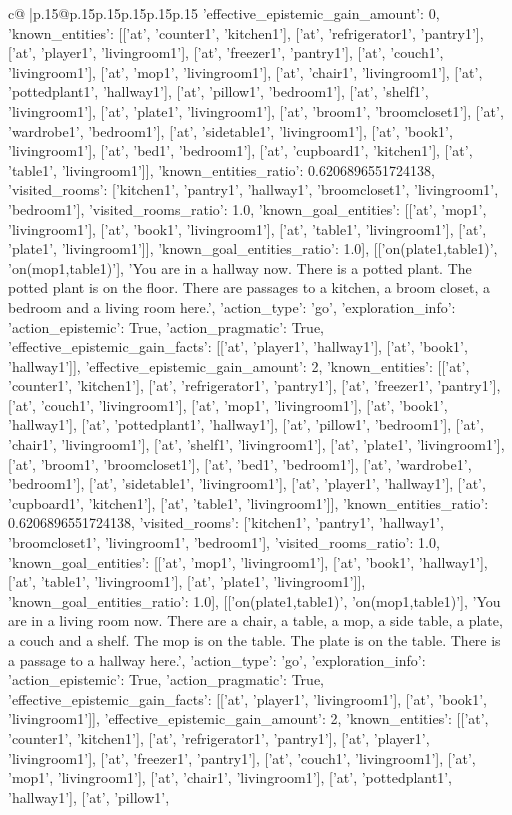 \documentclass{article}
\begin{document}
{\begin{supertabular}{c@{$\;$}|p{.15\linewidth}@{}p{.15\linewidth}p{.15\linewidth}p{.15\linewidth}p{.15\linewidth}p{.15\linewidth}}
{{{'effective_epistemic_gain_amount': 0, 'known_entities': [['at', 'counter1', 'kitchen1'], ['at', 'refrigerator1', 'pantry1'], ['at', 'player1', 'livingroom1'], ['at', 'freezer1', 'pantry1'], ['at', 'couch1', 'livingroom1'], ['at', 'mop1', 'livingroom1'], ['at', 'chair1', 'livingroom1'], ['at', 'pottedplant1', 'hallway1'], ['at', 'pillow1', 'bedroom1'], ['at', 'shelf1', 'livingroom1'], ['at', 'plate1', 'livingroom1'], ['at', 'broom1', 'broomcloset1'], ['at', 'wardrobe1', 'bedroom1'], ['at', 'sidetable1', 'livingroom1'], ['at', 'book1', 'livingroom1'], ['at', 'bed1', 'bedroom1'], ['at', 'cupboard1', 'kitchen1'], ['at', 'table1', 'livingroom1']], 'known_entities_ratio': 0.6206896551724138, 'visited_rooms': ['kitchen1', 'pantry1', 'hallway1', 'broomcloset1', 'livingroom1', 'bedroom1'], 'visited_rooms_ratio': 1.0, 'known_goal_entities': [['at', 'mop1', 'livingroom1'], ['at', 'book1', 'livingroom1'], ['at', 'table1', 'livingroom1'], ['at', 'plate1', 'livingroom1']], 'known_goal_entities_ratio': 1.0}}], [['on(plate1,table1)', 'on(mop1,table1)'], 'You are in a hallway now. There is a potted plant. The potted plant is on the floor. There are passages to a kitchen, a broom closet, a bedroom and a living room here.', {'action_type': 'go', 'exploration_info': {'action_epistemic': True, 'action_pragmatic': True, 'effective_epistemic_gain_facts': [['at', 'player1', 'hallway1'], ['at', 'book1', 'hallway1']], 'effective_epistemic_gain_amount': 2, 'known_entities': [['at', 'counter1', 'kitchen1'], ['at', 'refrigerator1', 'pantry1'], ['at', 'freezer1', 'pantry1'], ['at', 'couch1', 'livingroom1'], ['at', 'mop1', 'livingroom1'], ['at', 'book1', 'hallway1'], ['at', 'pottedplant1', 'hallway1'], ['at', 'pillow1', 'bedroom1'], ['at', 'chair1', 'livingroom1'], ['at', 'shelf1', 'livingroom1'], ['at', 'plate1', 'livingroom1'], ['at', 'broom1', 'broomcloset1'], ['at', 'bed1', 'bedroom1'], ['at', 'wardrobe1', 'bedroom1'], ['at', 'sidetable1', 'livingroom1'], ['at', 'player1', 'hallway1'], ['at', 'cupboard1', 'kitchen1'], ['at', 'table1', 'livingroom1']], 'known_entities_ratio': 0.6206896551724138, 'visited_rooms': ['kitchen1', 'pantry1', 'hallway1', 'broomcloset1', 'livingroom1', 'bedroom1'], 'visited_rooms_ratio': 1.0, 'known_goal_entities': [['at', 'mop1', 'livingroom1'], ['at', 'book1', 'hallway1'], ['at', 'table1', 'livingroom1'], ['at', 'plate1', 'livingroom1']], 'known_goal_entities_ratio': 1.0}}], [['on(plate1,table1)', 'on(mop1,table1)'], 'You are in a living room now. There are a chair, a table, a mop, a side table, a plate, a couch and a shelf. The mop is on the table. The plate is on the table. There is a passage to a hallway here.', {'action_type': 'go', 'exploration_info': {'action_epistemic': True, 'action_pragmatic': True, 'effective_epistemic_gain_facts': [['at', 'player1', 'livingroom1'], ['at', 'book1', 'livingroom1']], 'effective_epistemic_gain_amount': 2, 'known_entities': [['at', 'counter1', 'kitchen1'], ['at', 'refrigerator1', 'pantry1'], ['at', 'player1', 'livingroom1'], ['at', 'freezer1', 'pantry1'], ['at', 'couch1', 'livingroom1'], ['at', 'mop1', 'livingroom1'], ['at', 'chair1', 'livingroom1'], ['at', 'pottedplant1', 'hallway1'], ['at', 'pillow1', }}}
\end{supertabular}}
\end{document}
